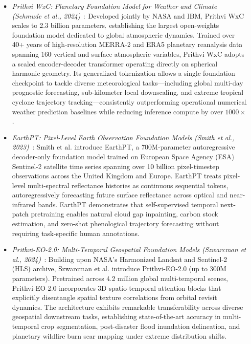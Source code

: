 \begin{itemize}[leftmargin=*]
    \item \emph{Prithvi WxC: Planetary Foundation Model for Weather and Climate (Schmude et al., 2024)}~\cite{schmude2024prithviwxc}: Developed jointly by NASA and IBM, Prithvi WxC scales to 2.3 billion parameters, establishing the largest open-weights foundation model dedicated to global atmospheric dynamics. Trained over 40+ years of high-resolution MERRA-2 and ERA5 planetary reanalysis data spanning 160 vertical and surface atmospheric variables, Prithvi WxC adopts a scaled encoder-decoder transformer operating directly on spherical harmonic geometry. Its generalized tokenization allows a single foundation checkpoint to tackle diverse meteorological tasks—including global multi-day prognostic forecasting, sub-kilometer local downscaling, and extreme tropical cyclone trajectory tracking—consistently outperforming operational numerical weather prediction baselines while reducing inference compute by over $1000\times$.
    \item \emph{EarthPT: Pixel-Level Earth Observation Foundation Models (Smith et al., 2023)}~\cite{smith2023earthpt}: Smith et al. introduce EarthPT, a 700M-parameter autoregressive decoder-only foundation model trained on European Space Agency (ESA) Sentinel-2 satellite time series spanning over 10 billion pixel-timestep observations across the United Kingdom and Europe. EarthPT treats pixel-level multi-spectral reflectance histories as continuous sequential tokens, autoregressively forecasting future surface reflectance across optical and near-infrared bands. EarthPT demonstrates that self-supervised temporal next-patch pretraining enables natural cloud gap inpainting, carbon stock estimation, and zero-shot phenological trajectory forecasting without requiring task-specific human annotations.
    \item \emph{Prithvi-EO-2.0: Multi-Temporal Geospatial Foundation Models (Szwarcman et al., 2024)}~\cite{szwarcman2024prithvieo2}: Building upon NASA's Harmonized Landsat and Sentinel-2 (HLS) archive, Szwarcman et al. introduce Prithvi-EO-2.0 (up to 300M parameters). Pretrained across 4.2 million global multi-temporal scenes, Prithvi-EO-2.0 incorporates 3D spatio-temporal attention blocks that explicitly disentangle spatial texture correlations from orbital revisit dynamics. The architecture exhibits remarkable transferability across diverse geospatial downstream tasks, establishing state-of-the-art accuracy in multi-temporal crop segmentation, post-disaster flood inundation delineation, and planetary wildfire burn scar mapping under extreme distribution shifts.

\end{itemize}
